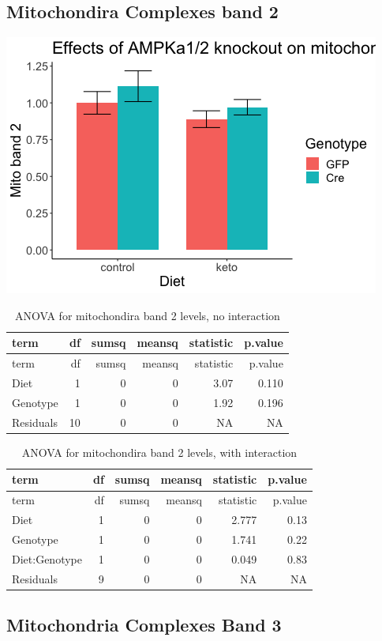\documentclass[
]{article}
\begin{document}
\hypertarget{mitochondira-complexes-band-2}{%
\subsection{Mitochondira Complexes band
2}\label{mitochondira-complexes-band-2}}

\includegraphics{figures/mitoband2-barplot-1.png}

\begin{longtable}[]{@{}lrrrrr@{}}
\caption{ANOVA for mitochondira band 2 levels, no
interaction}\tabularnewline
\toprule
term & df & sumsq & meansq & statistic & p.value\tabularnewline
\midrule
\endfirsthead
\toprule
term & df & sumsq & meansq & statistic & p.value\tabularnewline
\midrule
\endhead
Diet & 1 & 0 & 0 & 3.07 & 0.110\tabularnewline
Genotype & 1 & 0 & 0 & 1.92 & 0.196\tabularnewline
Residuals & 10 & 0 & 0 & NA & NA\tabularnewline
\bottomrule
\end{longtable}

\begin{longtable}[]{@{}lrrrrr@{}}
\caption{ANOVA for mitochondira band 2 levels, with
interaction}\tabularnewline
\toprule
term & df & sumsq & meansq & statistic & p.value\tabularnewline
\midrule
\endfirsthead
\toprule
term & df & sumsq & meansq & statistic & p.value\tabularnewline
\midrule
\endhead
Diet & 1 & 0 & 0 & 2.777 & 0.13\tabularnewline
Genotype & 1 & 0 & 0 & 1.741 & 0.22\tabularnewline
Diet:Genotype & 1 & 0 & 0 & 0.049 & 0.83\tabularnewline
Residuals & 9 & 0 & 0 & NA & NA\tabularnewline
\bottomrule
\end{longtable}

\hypertarget{mitochondria-complexes-band-3}{%
\subsection{Mitochondria Complexes Band
3}\label{mitochondria-complexes-band-3}}
\end{document}
